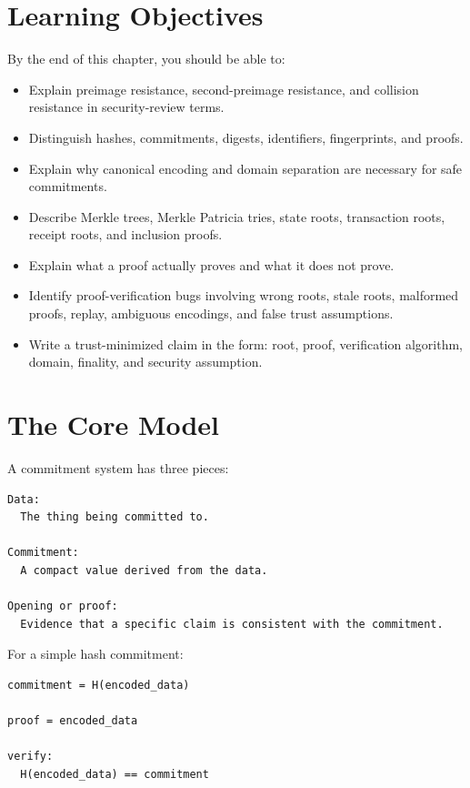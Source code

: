 \section{Learning Objectives}

By the end of this chapter, you should be able to:

\begin{itemize}
\tightlist
\item
  Explain preimage resistance, second-preimage resistance, and collision
  resistance in security-review terms.
\item
  Distinguish hashes, commitments, digests, identifiers, fingerprints,
  and proofs.
\item
  Explain why canonical encoding and domain separation are necessary for
  safe commitments.
\item
  Describe Merkle trees, Merkle Patricia tries, state roots, transaction
  roots, receipt roots, and inclusion proofs.
\item
  Explain what a proof actually proves and what it does not prove.
\item
  Identify proof-verification bugs involving wrong roots, stale roots,
  malformed proofs, replay, ambiguous encodings, and false trust
  assumptions.
\item
  Write a trust-minimized claim in the form: root, proof, verification
  algorithm, domain, finality, and security assumption.
\end{itemize}

\section{The Core Model}

A commitment system has three pieces:

\begin{lstlisting}
Data:
  The thing being committed to.

Commitment:
  A compact value derived from the data.

Opening or proof:
  Evidence that a specific claim is consistent with the commitment.
\end{lstlisting}

For a simple hash commitment:

\begin{lstlisting}
commitment = H(encoded_data)

proof = encoded_data

verify:
  H(encoded_data) == commitment
\end{lstlisting}

